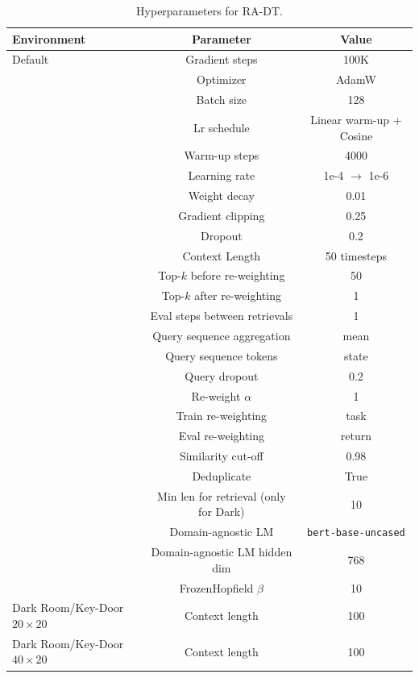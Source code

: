 \documentclass{article}
\begin{document}
\begin{table}[]
    \centering
    \caption{Hyperparameters for RA-DT.}
    \begin{tabular}{l | c c}
    \toprule
    \textbf{Environment} & \textbf{Parameter} & \textbf{Value} \\
    \midrule
     Default &      Gradient steps & 100K \\
      &      Optimizer & AdamW \\
      &      Batch size & 128 \\
      &      Lr schedule & Linear warm-up + Cosine \\
      &      Warm-up steps & 4000 \\
      &      Learning rate & 1e-4 $\rightarrow$ 1e-6\\
      &      Weight decay & 0.01 \\
      &      Gradient clipping & 0.25 \\
      &      Dropout & 0.2 \\
      &      Context Length & 50 timesteps \\
      &      Top-$k$ before re-weighting & 50 \\
      &      Top-$k$ after re-weighting & 1 \\
      &      Eval steps between retrievals & 1 \\
      &      Query sequence aggregation & mean \\
      &      Query sequence tokens & state \\
      &      Query dropout & 0.2 \\
      &      Re-weight $\alpha$ & 1 \\
      &      Train re-weighting & task \\
      &      Eval re-weighting & return \\
      &      Similarity cut-off & 0.98 \\
      &      Deduplicate & True \\
      &      Min len for retrieval (only for Dark) & 10 \\
      &      Domain-agnostic LM & \texttt{bert-base-uncased} \\
      &      Domain-agnostic LM hidden dim & 768 \\
      &      FrozenHopfield $\beta$ & 10 \\
    \midrule
     Dark Room/Key-Door $20\times20$ &      Context length & 100 \\
    \midrule
     Dark Room/Key-Door $40\times20$ &      Context length & 100 \\

\end{tabular}
\end{table}
\end{document}
